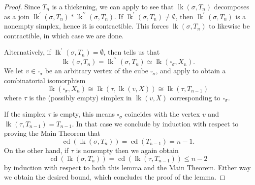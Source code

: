 \documentclass[10pt,a4paper]{amsart}
\newcommand{\cdim}{\operatorname{cd}}
\newcommand{\lk}{\operatorname{lk}}
\begin{document}
\begin{proof}
Since $T_n$ is a thickening, we can apply  to see that $\lk(\sigma, T_n)$ decomposes as a join $\lk^\prime(\sigma, T_n)*\lk^{\prime\prime}(\sigma, T_n)$. If $\lk^\prime(\sigma, T_n)\neq \emptyset$, then $\lk^\prime(\sigma, T_n)$ is a nonempty simplex, hence it is contractible. This forces $\lk(\sigma, T_n)$ to likewise be contractible, in which case we are done.

Alternatively, if $\lk^\prime(\sigma, T_n)= \emptyset$, then  tells us that
    \[ \lk(\sigma, T_n) = \lk^{\prime\prime}(\sigma, T_n) \simeq \lk(\square_\sigma, X_n). \]
We let $v\in \square_\sigma$ be an arbitrary vertex of the cube $\square_\sigma$, and apply  to obtain a combinatorial isomorphism
    \[ \lk(\square_\sigma, X_n) \cong \lk(\tau, \lk(v,X)) \cong \lk(\tau, T_{n-1}) \]
where $\tau$ is the (possibly empty) simplex in $\lk(v,X)$ corresponding to $\square_\sigma$.

If the simplex $\tau$ is empty, this means $\square_\sigma$ coincides with the vertex $v$ and $\lk(\tau, T_{n-1}) = T_{n-1}$. In that case we conclude by induction with respect to proving the Main Theorem that
    \[ \cdim(\lk(\sigma, T_n)) = \cdim(T_{n-1}) = n-1. \]
On the other hand, if $\tau$ is nonempty then we again obtain
    \[ \cdim(\lk(\sigma, T_n)) = \cdim(\lk(\tau,T_{n-1})) \leq n-2 \]
by induction with respect to both this lemma and the Main Theorem. Either way we obtain the desired bound, which concludes the proof of the lemma.
\end{proof}
\end{document}
